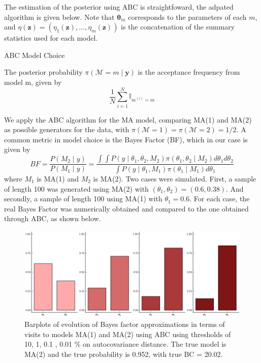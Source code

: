 \documentclass[runningheads]{llncs}
\begin{document}
The estimation of the posterior using ABC is straightfoward, the adpated algorithm is given below. Note that
$\bm \theta_m$ corresponds to the parameters of each $m$, and
$\eta(\bm z) = (\eta_1(\bm z),...,\eta_m(\bm z))$ is the concatenation
of the summary statistics used for each model.

\newpage
  \begin{algorithm}[H]
  \SetAlgoLined
   \caption{ABC Model Choice}
  \end{algorithm}
\hfill\break

  The posterior probability $\pi(\mathcal{M}=m \mid \bm y)$
  is the acceptance frequency from model m, given by
  \begin{equation}
  \frac{1}{N}\sum^N_{i=1}\mathbb I_{m^{(i)}=m}
  \end{equation}

We apply the ABC algorithm for the MA model, comparing
MA(1) and MA(2) as possible generators for the data, with
$\pi(\mathcal{M}=1)=\pi(\mathcal{M}=2) = 1/2$. A common
metric in model choice is the Bayes Factor (BF), which in our
case is given by
\begin{equation}
BF = \frac{P(M_2 \mid y)}{P(M_1 \mid y)}  = 
\frac{\int \int P(y \mid \theta_1, \theta_2, M_2)\pi(\theta_1,\theta_2 \mid M_2)d\theta_1d\theta_2}
{\int P(y \mid \theta_1, M_1)\pi(\theta_1 \mid M_1)d\theta_1}
\end{equation}
where $M_1$ is MA(1) and $M_2$ is MA(2).
Two cases were simulated. First, a sample of length 100 was
generated using MA(2) with $(\theta_1,\theta_2) = (0.6,0.38)$. And
secondly, a sample of length 100 using MA(1) with $\theta_1 = 0.6$.
For each case, the real Bayes Factor was numerically obtained and 
compared to the one obtained through ABC, as shown below.

\hfill\break
    \begin{figure}[H]
        \centering
        \includegraphics[width=12cm]{images/ModelChoice_MA2.png}
        \caption{Barplots of evolution of Bayes factor approximations
        in terms of visits to models MA(1) and MA(2) using
        ABC using thresholds of 10, 1, 0.1 , 0.01 \% on autocovariance
        distance. The true model is MA(2) and the true probability
        is 0.952, with true BC = 20.02.
        }
    \end{figure}
\end{document}
